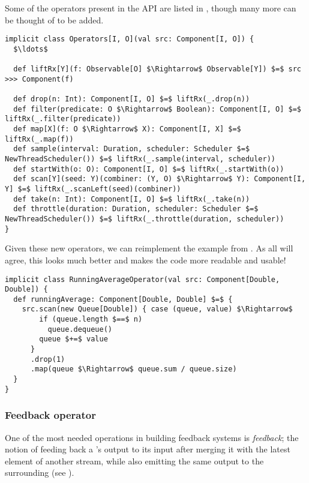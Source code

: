 Some of the operators present in the API are listed in , though many more can be thought of to be added.

\begin{lstlisting}[style=ScalaStyle, caption={Rx style operators}, label={lst:rx-style-operators}]
implicit class Operators[I, O](val src: Component[I, O]) {
  $\ldots$

  def liftRx[Y](f: Observable[O] $\Rightarrow$ Observable[Y]) $=$ src >>> Component(f)
  
  def drop(n: Int): Component[I, O] $=$ liftRx(_.drop(n))
  def filter(predicate: O $\Rightarrow$ Boolean): Component[I, O] $=$ liftRx(_.filter(predicate))
  def map[X](f: O $\Rightarrow$ X): Component[I, X] $=$ liftRx(_.map(f))
  def sample(interval: Duration, scheduler: Scheduler $=$ NewThreadScheduler()) $=$ liftRx(_.sample(interval, scheduler))
  def startWith(o: O): Component[I, O] $=$ liftRx(_.startWith(o))
  def scan[Y](seed: Y)(combiner: (Y, O) $\Rightarrow$ Y): Component[I, Y] $=$ liftRx(_.scanLeft(seed)(combiner))
  def take(n: Int): Component[I, O] $=$ liftRx(_.take(n))
  def throttle(duration: Duration, scheduler: Scheduler $=$ NewThreadScheduler()) $=$ liftRx(_.throttle(duration, scheduler))
}
\end{lstlisting}

Given these new operators, we can reimplement the  example from . As all will agree, this looks much better and makes the code more readable and usable!

\begin{lstlisting}[style=ScalaStyle, caption={Implementation of \code{RunningAverage} using the new operators}, label={lst:running-average-with-operators}]
implicit class RunningAverageOperator(val src: Component[Double, Double]) {
  def runningAverage: Component[Double, Double] $=$ {
    src.scan(new Queue[Double]) { case (queue, value) $\Rightarrow$
        if (queue.length $==$ n)
          queue.dequeue()
        queue $+=$ value
      }
      .drop(1)
      .map(queue $\Rightarrow$ queue.sum / queue.size)
  }
}
\end{lstlisting}

\subsubsection{Feedback operator}
One of the most needed operations in building feedback systems is \textit{feedback}; the notion of feeding back a \comp's output to its input after merging it with the latest element of another stream, while also emitting the same output to the surrounding \comp (see ).

